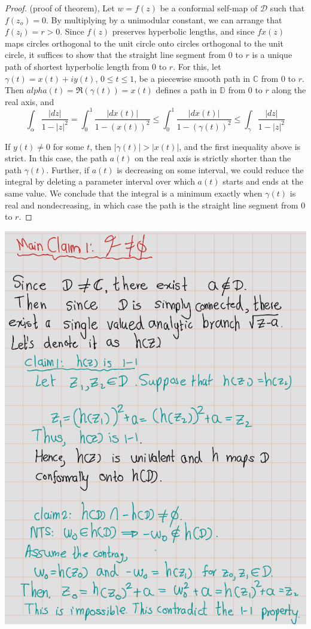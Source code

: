 \documentclass[
]{book}
\theoremstyle{definition}
\theoremstyle{definition}
\theoremstyle{definition}
\theoremstyle{definition}
\theoremstyle{remark}
\begin{document}
\begin{proof}
(proof of theorem), Let \(w = f(z)\) be a conformal self-map of \(\mathcal{D}\)
such that \(f(z_o) = 0\).
By multiplying by a unimodular constant, we can arrange that \(f(z_l) = r > 0\). Since \(f(z)\) preserves hyperbolic lengths, and since \(fx(z)\) maps circles orthogonal to the unit circle onto circles orthogonal to the unit circle, it suffices to show that the straight line segment from 0 to \(r\) is a unique path of shortest hyperbolic length from 0 to \(r\).
For this, let \(\gamma(t) = x(t) + iy(t)\), \(0 \leq t \leq 1\), be a piecewise smooth path in \(\mathbb{C}\) from 0 to \(r\).
Then \(alpha(t) = \Re(\gamma(t)) = x(t)\) defines a path in \(\mathbb{D}\) from 0 to \(r\) along the real axis, and
\[\int_\alpha \frac{|dz|}{1-|z|^2}=\int_0^1\frac{|dx(t)|}{1-(x(t))^2}\leq \int_0^1\frac{|dx(t)|}{1-(\gamma(t))^2}\leq \int_\gamma \frac{|dz|}{1-|z|^2}\]

If \(y(t) \neq 0\) for some \(t\), then \(|\gamma(t)| > |x(t)|\), and the first inequality above is strict. In this case, the path \(a(t)\) on the real axis is strictly shorter than the path \(\gamma(t)\). Further, if \(a(t)\) is decreasing on some interval, we could reduce the integral by deleting a parameter interval over which \(a(t)\) starts and ends at the same value. We conclude that the integral is a minimum exactly when \(\gamma(t)\) is real and nondecreasing, in which case the path is the straight line segment from 0 to \(r\).
\end{proof}

\begin{center}\includegraphics[width=8.96in]{figures/Riemann_Mapping_Therom/fig5} \end{center}
\end{document}
